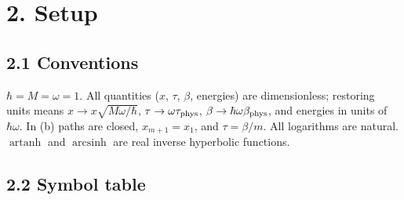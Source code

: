 \documentclass[11pt,a4paper]{article}
\begin{document}
\tableofcontents

\hypertarget{setup}{%
\section{2. Setup}\label{setup}}

\hypertarget{conventions}{%
\subsection{2.1 Conventions}\label{conventions}}

\(\hbar = M = \omega = 1\). All quantities (\(x\), \(\tau\), \(\beta\),
energies) are dimensionless; restoring units means
\(x \to x\sqrt{M\omega/\hbar}\), \(\tau \to \omega\tau_{\rm phys}\),
\(\beta \to \hbar\omega\beta_{\rm phys}\), and energies in units of
\(\hbar\omega\). In (b) paths are closed, \(x_{m+1} = x_1\), and
\(\tau = \beta/m\). All logarithms are natural.
\(\operatorname{artanh}\) and \(\operatorname{arcsinh}\) are real
inverse hyperbolic functions.

\hypertarget{symbol-table}{%
\subsection{2.2 Symbol table}\label{symbol-table}}
\end{document}
